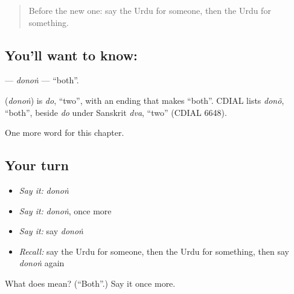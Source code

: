 \label{lesson:UR-C89-donon}



\begin{quote}
Before the new one: say the Urdu for someone, then the Urdu for something.
\end{quote}

\subsection*{You'll want to know: }
\textbf{} — \emph{donoṅ} — \textquotedblleft{}both\textquotedblright{}.

\begin{cousinweb}
\textbf{} (\emph{donoṅ}) is \emph{do}, \textquotedblleft{}two\textquotedblright{}, with an ending that makes \textquotedblleft{}both\textquotedblright{}. CDIAL lists \emph{donõ}, \textquotedblleft{}both\textquotedblright{}, beside \emph{do} under Sanskrit \emph{dva}, \textquotedblleft{}two\textquotedblright{} (CDIAL 6648).
\end{cousinweb}

\begin{grammarlens}[title={What you've built}]
One more word for this chapter.
\end{grammarlens}

\subsection*{Your turn}
\begin{itemize}
\raggedright
  \item \emph{Say it:} \emph{donoṅ}
  \item \emph{Say it:} \emph{donoṅ}, once more
  \item \emph{Say it:} say \emph{donoṅ}
  \item \emph{Recall:} say the Urdu for someone, then the Urdu for something, then say \emph{donoṅ} again
\end{itemize}

\begin{tcolorbox}[breakable,colback=teal!4,colframe=teal!35!black,title={Before you move on}]
What does  mean? (\textquotedblleft{}Both\textquotedblright{}.) Say it once more.
\end{tcolorbox}
